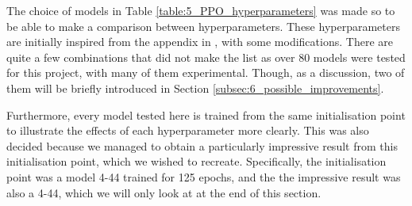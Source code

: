 The choice of models in Table \ref{table:5_PPO_hyperparameters} was made so to be able to make a comparison between hyperparameters. These hyperparameters are initially inspired from the appendix in \cite{PPO}, with some modifications. There are quite a few combinations that did not make the list as over 80 models were tested for this project, with many of them experimental. Though, as a discussion, two of them will be briefly introduced in Section \ref{subsec:6_possible_improvements}.

Furthermore, every model tested here is trained from the same initialisation point to illustrate the effects of each hyperparameter more clearly. This was also decided because we managed to obtain a particularly impressive result from this initialisation point, which we wished to recreate.
Specifically, the initialisation point was a model 4-44 trained for 125 epochs, and the the impressive result was also a 4-44, which we will only look at at the end of this section.

